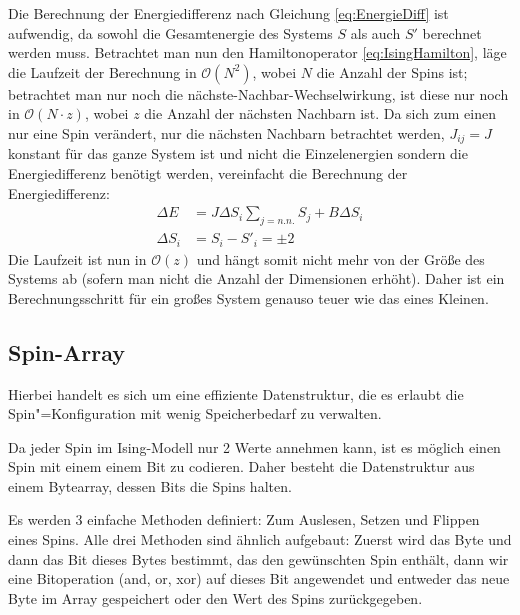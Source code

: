Die Berechnung der Energiedifferenz nach Gleichung \eqref{eq:EnergieDiff} ist aufwendig, da sowohl die Gesamtenergie des Systems $S$ als auch $S'$ berechnet werden muss. Betrachtet man nun den Hamiltonoperator \eqref{eq:IsingHamilton}, läge die Laufzeit der Berechnung in $\mathcal O(N^2)$, wobei $N$ die Anzahl  der Spins ist; betrachtet man nur noch die nächste-Nachbar-Wechselwirkung, ist diese nur noch in $\mathcal O(N\cdot z)$, wobei $z$ die Anzahl der nächsten Nachbarn ist.
Da sich zum einen nur eine Spin verändert, nur die nächsten Nachbarn betrachtet werden, $J_{ij} = J$ konstant für das ganze System ist und nicht die Einzelenergien sondern die Energiedifferenz benötigt werden, vereinfacht die Berechnung der Energiedifferenz: 
\begin{align}
\Delta    E &= J \Delta S_i \sum_{j=n.n.} S_j + B \Delta S_i \\
\Delta S_i &= S_i - S'_i = \pm 2
\end{align}
Die Laufzeit ist nun in $\mathcal O(z)$ und hängt somit nicht mehr von der Größe des Systems ab (sofern man nicht die Anzahl der Dimensionen erhöht). Daher ist ein Berechnungsschritt für ein großes System genauso teuer wie das eines Kleinen.



\subsection{Spin-Array}
\label{sec:SpinArray}
Hierbei handelt es sich um eine effiziente Datenstruktur, die es erlaubt die Spin"=Konfiguration mit wenig Speicherbedarf zu verwalten.

Da jeder Spin im Ising-Modell nur 2 Werte annehmen kann, ist es möglich einen Spin mit einem einem Bit zu codieren. Daher besteht die Datenstruktur aus einem Bytearray, dessen Bits die Spins halten.

Es werden 3 einfache Methoden definiert: Zum Auslesen, Setzen und Flippen eines Spins. Alle drei Methoden sind ähnlich aufgebaut: Zuerst wird das Byte und dann das Bit dieses Bytes bestimmt, das den gewünschten Spin enthält, dann wir eine Bitoperation (and, or, xor) auf dieses Bit angewendet und entweder das neue Byte im Array gespeichert oder den Wert des Spins zurückgegeben.


